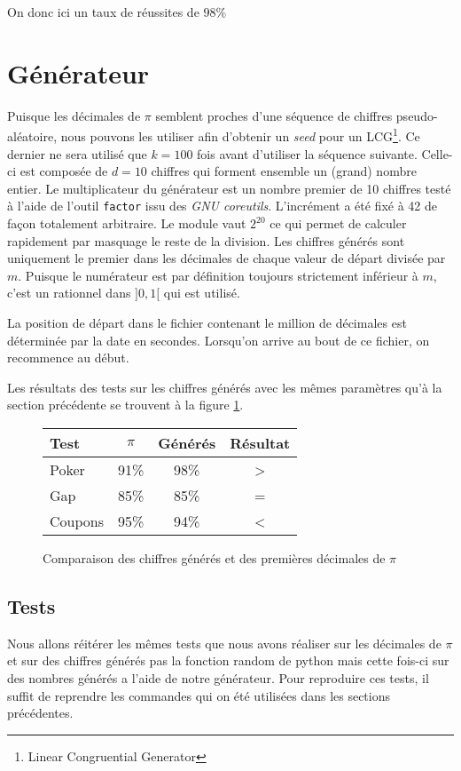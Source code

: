 \documentclass[12pt,a4paper]{article}
\begin{document}
On donc ici un taux de réussites de $98\%$
\section{Générateur}
Puisque les décimales de $\pi$ semblent proches d'une séquence de chiffres
pseudo-aléatoire, nous pouvons les utiliser afin d'obtenir un \textit{seed}
pour un LCG\footnote{Linear Congruential Generator}. Ce dernier ne sera utilisé
que $k=100$ fois avant d'utiliser la séquence suivante. Celle-ci est composée de
$d=10$ chiffres qui forment ensemble un (grand) nombre entier.
Le multiplicateur du générateur est un nombre premier de 10 chiffres testé
à l'aide de l'outil \texttt{factor} issu des \textit{GNU coreutils}.
L'incrément a été fixé à 42 de façon totalement arbitraire.
Le module vaut $2^{20}$ ce qui permet de calculer rapidement par masquage
le reste de la division.
Les chiffres générés sont uniquement le premier dans les décimales de chaque
valeur de départ divisée par $m$.
Puisque le numérateur est par définition toujours strictement inférieur à $m$,
c'est un rationnel dans $]0,1[$ qui est utilisé.

La position de départ dans le fichier contenant le million de décimales
est déterminée par la date en secondes. Lorsqu'on arrive au bout de ce fichier,
on recommence au début.

Les résultats des tests sur les chiffres générés avec les mêmes paramètres
qu'à la section précédente se trouvent à la figure \ref{fig:genD}.

\begin{figure}
\center
\begin{tabular}{l|c|c|c}
Test & $\pi$ & Générés & Résultat \\ \hline \hline
Poker & 91\% & 98\% & > \\ \hline
Gap & 85\% & 85\% & = \\ \hline
Coupons & 95\% & 94\% & <
\end{tabular}
\caption{Comparaison des chiffres générés et des premières décimales de $\pi$}
\label{fig:genD}
\end{figure}

\subsection{Tests}
Nous allons réitérer les mêmes tests que nous avons réaliser sur les décimales de $\pi$ et sur des chiffres générés pas la fonction random de python mais cette fois-ci sur des nombres générés a l'aide de notre générateur.
Pour reproduire ces tests, il suffit de reprendre les commandes qui on été utilisées dans les sections précédentes.
\end{document}
